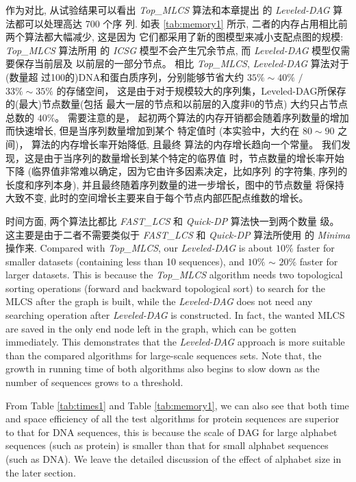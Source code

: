 \documentclass[utf8]{frontiersSCNS} %
\begin{document}
作为对比, 从试验结果可以看出 \emph{Top\_MLCS} 算法和本章提出
的 \emph{Leveled-DAG} 算法都可以处理高达 700 个序
列. 如表 \ref{tab:memory1} 所示, 二者的内存占用相比前两个算法都大幅减少, 这是因为
它们都采用了新的图模型来减小支配点图的规模: \emph{Top\_MLCS} 算法所用
的 \emph{ICSG} 模型不会产生冗余节点, 而 \emph{Leveled-DAG} 模型仅需要保存当前层及
以前层的一部分节点。 相比 \emph{Top\_MLCS}, \emph{Leveled-DAG} 算法对于(数量超
过100的)DNA和蛋白质序列，分别能够节省大约 $35\% \sim 40\%$ $/$ $33\% \sim 35\%$
的存储空间， 这是由于对于规模较大的序列集，Leveled-DAG所保存的(最大)节点数量(包括
最大一层的节点和以前层的入度非0的节点) 大约只占节点总数的 $40\%$。 需要注意的是，
起初两个算法的内存开销都会随着序列数量的增加而快速增长, 但是当序列数量增加到某个
特定值时 (本实验中，大约在 $80 \sim 90$ 之间)， 算法的内存增长率开始降低, 且最终
算法的内存增长趋向一个常量。 我们发现，这是由于当序列的数量增长到某个特定的临界值
时，节点数量的增长率开始下降 (临界值非常难以确定，因为它由许多因素决定，比如序列
的字符集, 序列的长度和序列本身), 并且最终随着序列数量的进一步增长，图中的节点数量
将保持大致不变, 此时的空间增长主要来自于每个节点内部匹配点维数的增长。

时间方面, 两个算法比都比 \emph{FAST\_LCS} 和 \emph{Quick-DP} 算法快一到两个数量
级。 这主要是由于二者不需要类似于 \emph{FAST\_LCS} 和 \emph{Quick-DP} 算法所使用
的 \emph{Minima} 操作来. Compared with \emph{Top\_MLCS}, our \emph{Leveled-DAG}
is about $10\%$ faster for smaller datasets (containing less than 10 sequences),
and $10\%$ $\sim$ $20\%$ faster for larger datasets. This is because the
\emph{Top\_MLCS} algorithm needs two topological sorting operations (forward and
backward topological sort) to search for the MLCS after the graph is built,
while the \emph{Leveled-DAG} does not need any searching operation after
\emph{Leveled-DAG} is constructed. In fact, the wanted MLCS are saved in the
only end node left in the graph, which can be gotten immediately. This
demonstrates that the \emph{Leveled-DAG} approach is more suitable than the
compared algorithms for large-scale sequences sets. Note that, the growth in
running time of both algorithms also begins to slow down as the number of
sequences grows to a threshold.

From Table \ref{tab:times1} and Table \ref{tab:memory1}, we can also
see that both time and space efficiency of all the test algorithms for
protein sequences are superior to that for DNA sequences, this is
because the scale of DAG for large alphabet sequences (such as
protein) is smaller than that for small alphabet sequences (such as
DNA). We leave the detailed discussion of the effect of alphabet size
in the later section.
\end{document}
